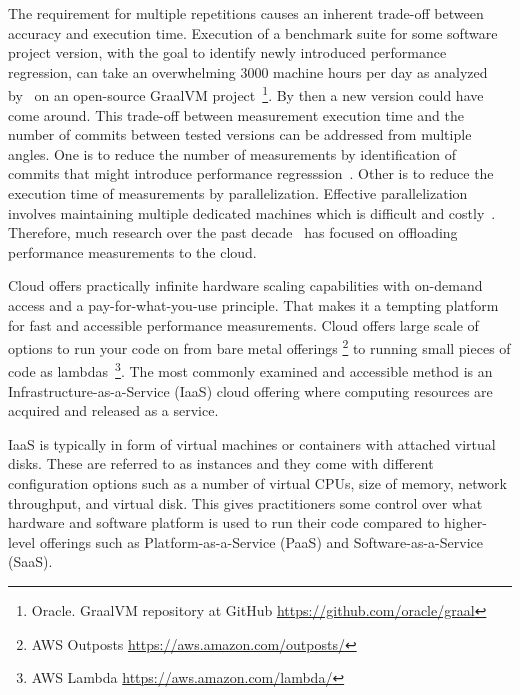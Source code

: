 The requirement for multiple repetitions causes an inherent trade-off between accuracy and execution time.
Execution of a benchmark suite for some software project version, with the goal to identify newly introduced performance regression, can take an overwhelming 3000 machine hours per day as analyzed by~\citet{bulej2020duet} on an open-source GraalVM project~\footnote{Oracle. GraalVM repository at GitHub \url{https://github.com/oracle/graal}}.
By then a new version could have come around.
This trade-off between measurement execution time and the number of commits between tested versions can be addressed from multiple angles.
One is to reduce the number of measurements by identification of commits that might introduce performance regresssion~\citet{oliveira2017perphecy}.
Other is to reduce the execution time of measurements by parallelization.
Effective parallelization involves maintaining multiple dedicated machines which is difficult and costly~.
Therefore, much research over the past decade~\cite{leitner2016patterns, laaber2019software, abedi2017conducting} has focused on offloading performance measurements to the cloud.

Cloud offers practically infinite hardware scaling capabilities with on-demand access and a pay-for-what-you-use principle.
That makes it a tempting platform for fast and accessible performance measurements.
Cloud offers large scale of options to run your code on from bare metal offerings \footnote{AWS Outposts \url{https://aws.amazon.com/outposts/}} to running small pieces of code as lambdas~\footnote{AWS Lambda \url{https://aws.amazon.com/lambda/}}.
The most commonly examined and accessible method is an Infrastructure-as-a-Service (IaaS) cloud offering where computing resources are acquired and released as a service.

IaaS is typically in form of virtual machines or containers with attached virtual disks.
These are referred to as instances and they come with different configuration options such as a number of virtual CPUs, size of memory, network throughput, and virtual disk.
This gives practitioners some control over what hardware and software platform is used to run their code compared to higher-level offerings such as Platform-as-a-Service (PaaS) and Software-as-a-Service (SaaS).

